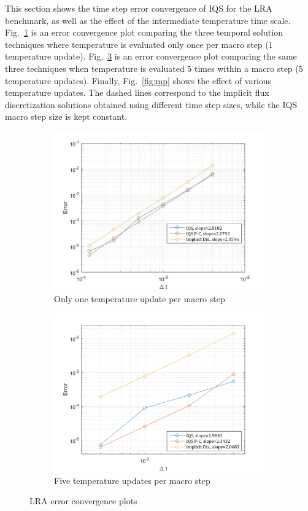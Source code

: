 \documentclass{elsarticle}
\newcommand{\fig}[1]{Fig.~\ref{#1}}                      %
\begin{document}
This section shows the time step error convergence of IQS for the LRA benchmark, as well as the effect of the intermediate temperature time scale. \fig{fig:lra_bad} is an error convergence plot comparing the three temporal solution techniques where temperature is evaluated only once per macro step (1 temperature update).  \fig{fig:lra_mpconv} is an error convergence plot comparing the same three techniques when temperature is evaluated 5 times within a macro step (5 temperature updates).  Finally, \fig{fig:mp} shows the effect of various temperature updates. The dashed lines correspond to the implicit flux discretization solutions obtained using different time step sizes, while the IQS macro step size is kept constant.

\begin{figure}[!htbp]
\centering
\begin{subfigure}[!htbp]{0.49\textwidth}
\includegraphics[width=\textwidth]{figures/lra_bad.png}
\caption{Only one temperature update per macro step}
\label{fig:lra_bad}
\end{subfigure}
\begin{subfigure}[!htbp]{0.49\textwidth}
\includegraphics[width=\textwidth]{figures/lra_mp_convergence.png}
\caption{Five temperature updates per macro step}
\label{fig:lra_mpconv}
\end{subfigure}
\caption{LRA error convergence plots}
\end{figure}
\end{document}
